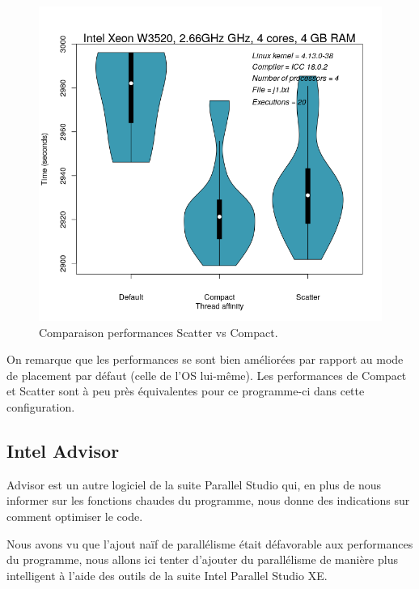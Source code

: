 \documentclass[
 aip,
 jmp,
 amsmath,amssymb,
 reprint
]{revtex4-1}
\begin{document}
\begin{figure}[H]
  \includegraphics[width=\linewidth, keepaspectratio=true]{defaultVSscatterVScompact.png}
  \caption{Comparaison performances Scatter vs Compact.\label{Fig:scatter_vs_compact}}
\end{figure}

On remarque que les performances se sont bien améliorées par rapport au mode de placement par défaut (celle de l'OS lui-même). Les performances de Compact et Scatter sont à peu près équivalentes\pageref{Fig:scatter_vs_compact} pour ce programme-ci dans cette configuration.

\subsection{Intel Advisor}

Advisor est un autre logiciel de la suite Parallel Studio qui, en plus de nous informer sur les fonctions chaudes du programme, nous donne des indications sur comment optimiser le code.\par
Nous avons vu que l'ajout naïf de parallélisme était défavorable aux performances du programme, nous allons ici tenter d'ajouter du parallélisme de manière plus intelligent à l'aide des outils de la suite Intel Parallel Studio XE.
\end{document}
